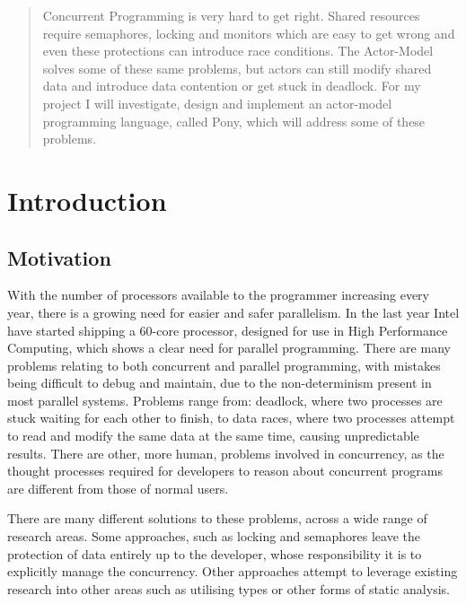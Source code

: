 \documentclass[pdftex,11pt,a4paper]{report}
\begin{document}
\setcounter{tocdepth}{2}
\tableofcontents

\newpage
\begin{abstract}

Concurrent Programming is very hard to get right.
Shared resources require semaphores, locking and monitors which are easy to get wrong and even these protections can introduce race conditions.
The Actor-Model solves some of these same problems, but actors can still modify shared data and introduce data contention or get stuck in deadlock.
For my project I will investigate, design and implement an actor-model programming language, called Pony, which will address some of these problems.
\end{abstract}

\chapter{Introduction}
\section{Motivation}

With the number of processors available to the programmer increasing every year\cite{freelunch}, there is a growing need for easier and safer parallelism.
In the last year Intel have started shipping a 60-core processor, designed for use in High Performance Computing\cite{intel-phi}, which shows a clear need for parallel programming.
There are many problems relating to both concurrent and parallel programming, with mistakes being difficult to debug and maintain, due to the non-determinism present in most parallel systems.
Problems range from: deadlock, where two processes are stuck waiting for each other to finish, to data races, where two processes attempt to read and modify the same data at the same time, causing unpredictable results.
There are other, more human, problems involved in concurrency, as the thought processes required for developers to reason about concurrent programs are different from those of normal users.

There are many different solutions to these problems, across a wide range of research areas.
Some approaches, such as locking and semaphores\cite{dijkstra-semaphore} leave the protection of data entirely up to the developer, whose responsibility it is to explicitly manage the concurrency.
Other approaches attempt to leverage existing research into other areas such as utilising types or other forms of static analysis.
\end{document}
